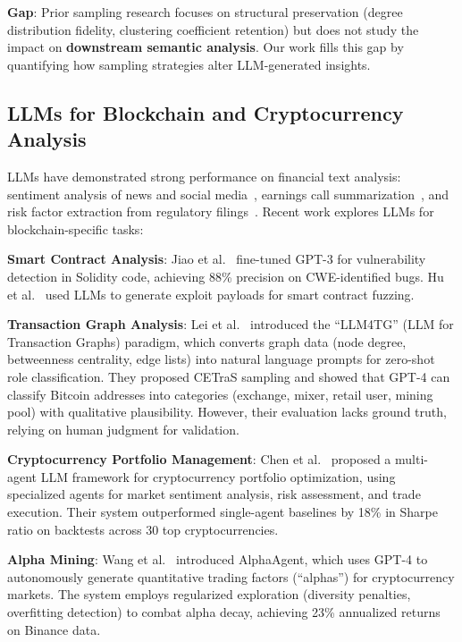 \textbf{Gap}: Prior sampling research focuses on structural preservation (degree distribution fidelity, clustering coefficient retention) but does not study the impact on \textbf{downstream semantic analysis}. Our work fills this gap by quantifying how sampling strategies alter LLM-generated insights.

\subsection{LLMs for Blockchain and Cryptocurrency Analysis}

LLMs have demonstrated strong performance on financial text analysis: sentiment analysis of news and social media~\cite{zhang2023sentiment}, earnings call summarization~\cite{huang2023}, and risk factor extraction from regulatory filings~\cite{chen2023finllm}. Recent work explores LLMs for blockchain-specific tasks:

\textbf{Smart Contract Analysis}: Jiao et al.~\cite{jiao2023} fine-tuned GPT-3 for vulnerability detection in Solidity code, achieving 88\% precision on CWE-identified bugs. Hu et al.~\cite{hu2023} used LLMs to generate exploit payloads for smart contract fuzzing.

\textbf{Transaction Graph Analysis}: Lei et al.~\cite{lei2025llm} introduced the ``LLM4TG'' (LLM for Transaction Graphs) paradigm, which converts graph data (node degree, betweenness centrality, edge lists) into natural language prompts for zero-shot role classification. They proposed CETraS sampling and showed that GPT-4 can classify Bitcoin addresses into categories (exchange, mixer, retail user, mining pool) with qualitative plausibility. However, their evaluation lacks ground truth, relying on human judgment for validation.

\textbf{Cryptocurrency Portfolio Management}: Chen et al.~\cite{chen2024llm} proposed a multi-agent LLM framework for cryptocurrency portfolio optimization, using specialized agents for market sentiment analysis, risk assessment, and trade execution. Their system outperformed single-agent baselines by 18\% in Sharpe ratio on backtests across 30 top cryptocurrencies.

\textbf{Alpha Mining}: Wang et al.~\cite{wang2024alphaagent} introduced AlphaAgent, which uses GPT-4 to autonomously generate quantitative trading factors (``alphas'') for cryptocurrency markets. The system employs regularized exploration (diversity penalties, overfitting detection) to combat alpha decay, achieving 23\% annualized returns on Binance data.

